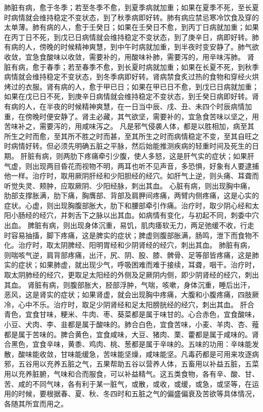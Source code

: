 \documentclass[12pt,UTF8]{ctexbook}
\begin{document}
肺脏有病，愈于冬季；若至冬季不愈，到夏季病就加重；如果在夏季不死，至长夏时病情就会维持稳定不变状态，到了秋季病即好转。肺有病应禁忌寒冷饮食及穿的太单薄。肺有病的人，愈于壬癸日；如果在壬癸日不愈，到丙丁日病就加重；如果在丙丁日不死，到戊已日病情就会维持稳定不变状态，到了庚辛日，病即好转。肺有病的人，傍晚的时候精神爽慧，到中午时病就加重，到半夜时变安静了。肺气欲收敛，宜急食酸味以收敛，需要补的，用酸味补肺，需要泻的，用辛味泻肺。
肾脏有病，愈于春季；若至春季不愈，到长夏时病就加重；如果在长夏不死，到秋季病情就会维持稳定不变状态，到冬季病即好转。肾病禁食炙过热的食物和穿经火烘烤过的衣服。肾有病的人，愈于甲已日；如果在甲已日不愈，到戊已日病就加重；如果在戊已日不死，到庚辛日病情就会维持稳定不变状态，到壬癸日病即好转。肾有病的人，在半夜的时候精神爽慧，在一日当中辰、戌、丑、未四个时辰病情加重，在傍晚时便安静了。肾主必藏，其气欲坚，需要补的，宜急食苦味以坚之，用苦味补之，需要泻的，用咸味泻之。
凡是邪气侵袭人体，都是以胜相加，病至其所生之时而愈，至其所不胜之时而甚，至其所生之时而病情稳定不变，至其自旺之时病情好转。但必须先明确五脏之平脉，然后始能推测疾病的轻重时间及死生的日期。
肝脏有病，则两肋下疼痛牵引少腹，使人多怒，这是肝气实的症状；如果肝气虚，则出现两目昏花而视物不明，两耳也听不见声音，多恐惧，好象有人要逮捕他一样。治疗时，取用厥阴肝经和少阳胆经的经穴。如肝气上逆，则头痛、耳聋而听觉失灵、颊肿，应取厥阴、少阳经脉，刺出其血。
心脏有病，则出现胸中痛，肋部支撑胀满，肋下痛，胸膺部、背部及肩胛间疼痛，两臂内侧疼痛，这是心实的症状。心虚，则出现胸腹部胀大，肋下和腰部牵引作痛。治疗时，取少阴心经和太阳小肠经的经穴，并刺舌下之脉以出其血。如病情有变化，与初起不同，刺委中穴出血。
脾脏有病，则出现身体沉重，易饥，肌肉痿软无力，两足弛缓不收，行走时容易抽搐，脚下疼痛，这是脾实的症状；脾虚则腹部胀满，肠鸣，泄下而食物不化。治疗时，取太阴脾经、阳明胃经和少阴肾经的经穴，刺出其血。
肺脏有病，则喘咳气逆，肩背部疼痛，出汗，尻、阴、股、膝、髀骨、足等部皆疼痛，这是肺实的症状；如果肺虚，就出现少气，呼吸困难而难于接续，耳聋，咽干。治疗时，取太阴肺经的经穴，更取足太阳经的外侧及足厥阴内侧，即少阴肾经的经穴，刺出其血。
肾脏有病，则腹部胀大，胫部浮肿，气喘，咳嗽，身体沉重，睡后出汗，恶风，这是肾实的症状；如果肾虚，就会出现胸中疼痛，大腹和小腹疼痛，四肢厥冷，心中不乐。治疗时，取足少阴肾经和足太阳膀胱经的经穴，刺出其血。
肝合青色，宜食甘味，粳米、牛肉、枣、葵菜都是属于味甘的。心合赤色，宜食酸味，小豆、犬肉、李、韭都是属于酸味的。肺合白色，宜食苦味，小麦、羊肉、杏、薤都是属于苦味的。脾合黄色，宜食咸味，大豆、猪肉、栗、藿都是属于咸味的。肾合黑色，宜食辛味，黄黍、鸡肉、桃、葱都是属于辛味的。五味的功用：辛味能发散，酸味能收敛，甘味能缓急，苦味能坚燥，咸味能坚。凡毒药都是可用来攻逐病邪，五谷用以充养五脏之气，五果帮助五谷以营养人体，五畜用以补益五脏，五菜用以充养脏腑，气味和合而服食，可以补益精气。这五类食物，各有辛、酸、甘、苦、咸的不同气味，各有利于某一脏气，或散，或收，或缓，或急，或坚等，在运用的时候，要根据春、夏、秋、冬四时和五脏之气的偏盛偏衰及苦欲等具体情况，各随其所宜而用之。
\end{document}
